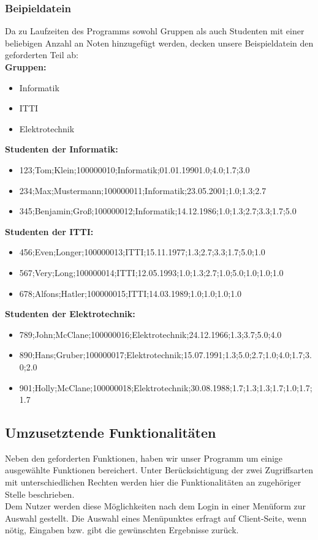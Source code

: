 \documentclass{scrartcl}
\begin{document}
		\subsubsection{Beipieldatein}
			Da zu Laufzeiten des Programms sowohl Gruppen als auch Studenten mit einer beliebigen Anzahl an Noten hinzugefügt werden, decken unsere Beispieldatein den geforderten Teil ab:\\
			\textbf{Gruppen:}
			\begin{itemize}
				\item Informatik
				\item ITTI
				\item Elektrotechnik
			\end{itemize}
			
			\textbf{Studenten der Informatik:}
			\begin{itemize}
				\item 123;Tom;Klein;100000010;Informatik;01.01.19901.0;4.0;1.7;3.0
				\item 234;Max;Mustermann;100000011;Informatik;23.05.2001;1.0;1.3;2.7
				\item 345;Benjamin;Groß;100000012;Informatik;14.12.1986;1.0;1.3;2.7;3.3;1.7;5.0
			\end{itemize}
			
			\textbf{Studenten der ITTI:}
			\begin{itemize}
				\item 456;Even;Longer;100000013;ITTI;15.11.1977;1.3;2.7;3.3;1.7;5.0;1.0
				\item 567;Very;Long;100000014;ITTI;12.05.1993;1.0;1.3;2.7;1.0;5.0;1.0;1.0;1.0
				\item 678;Alfons;Hatler;100000015;ITTI;14.03.1989;1.0;1.0;1.0;1.0
			\end{itemize}
			
			\textbf{Studenten der Elektrotechnik:}
			\begin{itemize}
				\item 789;John;McClane;100000016;Elektrotechnik;24.12.1966;1.3;3.7;5.0;4.0
				\item 890;Hans;Gruber;100000017;Elektrotechnik;15.07.1991;1.3;5.0;2.7;1.0;4.0;1.7;3.0;2.0
				\item 901;Holly;McClane;100000018;Elektrotechnik;30.08.1988;1.7;1.3;1.3;1.7;1.0;1.7;1.7
			\end{itemize}
		
	\subsection{Umzusetztende Funktionalitäten}
		Neben den geforderten Funktionen, haben wir unser Programm um einige ausgewählte Funktionen bereichert. Unter Berücksichtigung der zwei Zugriffsarten mit unterschiedlichen Rechten werden hier die Funktionalitäten an zugehöriger Stelle beschrieben.\\
		Dem Nutzer werden diese Möglichkeiten nach dem Login in einer Menüform zur Auswahl gestellt. Die Auswahl eines Menüpunktes erfragt auf Client-Seite, wenn nötig, Eingaben bzw. gibt die gewünschten Ergebnisse zurück.
\end{document}
